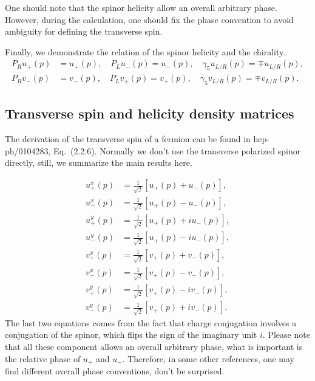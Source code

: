 \documentclass[a4paper,11pt]{article}
\newcommand{\bb}[1]{\left[#1\right]}
\begin{document}
One should note that the spinor helicity allow an overall arbitrary phase. However, during the calculation, one should fix the phase convention to avoid ambiguity for defining the transverse spin.
    

Finally, we demonstrate the relation of the spinor helicity and the chirality.
\begin{align}
    P_R u_+(p) &= u_+(p), \quad P_L u_-(p) = u_-(p), \quad \gamma_5 u_{L/R}(p) = \mp u_{L/R}(p), \\
    P_R v_-(p) &= v_-(p), \quad P_L v_+(p) = v_+(p), \quad \gamma_5 v_{L/R}(p) = \mp v_{L/R}(p).
\end{align}

\subsection{Transverse spin and helicity density matrices}
\begin{sloppypar}
The derivation of the transverse spin of a fermion can be found in hep-ph/0104283, Eq.~(2.2.6). Normally we don't use the transverse polarized spinor directly, still, we summarize the main results here.
\end{sloppypar}
\begin{align}
    u^x_+(p) &= \frac{1}{\sqrt{2}}\bb{u_+(p) + u_-(p)}, \\
    u^x_-(p) &= \frac{1}{\sqrt{2}}\bb{u_+(p) - u_-(p)}, \\
    u^y_+(p) &= \frac{1}{\sqrt{2}}\bb{u_+(p) + i u_-(p)}, \\
    u^y_-(p) &= \frac{1}{\sqrt{2}}\bb{u_+(p) - i u_-(p)}, \\
    v^x_+(p) &= \frac{1}{\sqrt{2}}\bb{v_+(p) + v_-(p)}, \\
    v^x_-(p) &= \frac{1}{\sqrt{2}}\bb{v_+(p) - v_-(p)}, \\
    v^y_+(p) &= \frac{1}{\sqrt{2}}\bb{v_+(p) - i v_-(p)}, \\
    v^y_-(p) &= \frac{1}{\sqrt{2}}\bb{v_+(p) + i v_-(p)}.
\end{align}
The last two equations comes from the fact that charge conjugation involves a conjugation of the spinor, which flips the sign of the imaginary unit $i$.
Please note that all these component allows an overall arbitrary phase, what is important is the relative phase of $u_+$ and $u_-$.
Therefore, in some other references, one may find different overall phase conventions, don't be surprised.
\end{document}

